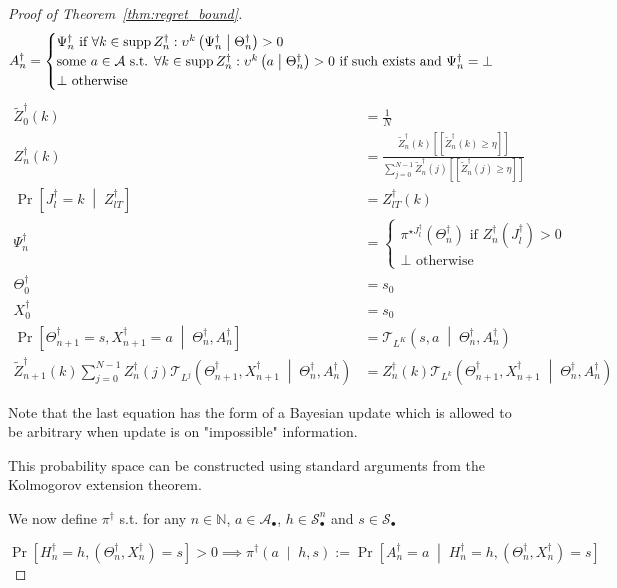 \documentclass[anon,12pt]{colt2018} %
\DeclareMathOperator{\Supp}{supp}
\newcommand{\AP}[1]{\left(#1\right)}
\newcommand{\APM}[2]{\left(#1\;\middle\vert\;#2\right)}
\newcommand{\ABM}[2]{\left[#1\;\middle\vert\;#2\right]}
\newcommand{\CP}[3]{\underset{#1}{\operatorname{Pr}}\ABM{#2}{#3}}
\newcommand{\Nats}{\mathbb{N}}
\newcommand{\A}{\mathcal{A}}
\newcommand{\St}{\mathcal{S}}
\newcommand{\T}{\mathcal{T}}
\newcommand{\Ad}{\upsilon}
\newcommand{\X}{\bullet}
\begin{document}
\begin{proof}[Proof of Theorem~\ref{thm:regret_bound}]
\[A^\dagger_n = \begin{cases} \Psi^\dagger_n \text{ if } \forall k \in \Supp{Z^\dagger_n}: \Ad^k\APM{\Psi^\dagger_n}{\Theta^\dagger_n} > 0 \\ \text{some } a\in\A \text{ s.t. } \forall k \in \Supp{Z^\dagger_n}: \Ad^k\APM{a}{\Theta^\dagger_n} > 0 \text{ if such exists and } \Psi^\dagger_n=\bot\\\bot \text{ otherwise} \end{cases}\\\]
%
\begin{align*}
\tilde{Z}^\dagger_0(k)&=\frac{1}{N} \\ 
Z^\dagger_{n}(k) &= \frac{\tilde{Z}^\dagger_{n}(k)[[\tilde{Z}^\dagger_{n}(k) \geq \eta]] }{\sum_{j = 0}^{N-1}\tilde{Z}^\dagger_{n}(j)[[\tilde{Z}^\dagger_{n}(j) \geq \eta]]}\\
\CP{}{J^\dagger_{l} = k}{Z^\dagger_{lT}} &= Z^\dagger_{lT}\left(k\right)\\
\Psi^\dagger_{n} &= \begin{cases} \pi^{\star J^\dagger_l}\AP{\Theta^\dagger_n} \text{ if } Z^\dagger_n\AP{J^\dagger_l} > 0 \\ \bot \text{ otherwise} \end{cases}\\
\Theta^\dagger_0 &= s_0\\
X^\dagger_0 &= s_0\\
\CP{}{\Theta^\dagger_{n+1} = s,X^\dagger_{n+1}=a}{\Theta^\dagger_{n},A^\dagger_n} &= \T_{L^K}\APM{s,a}{\Theta^\dagger_n,A^\dagger_n}\\
\tilde{Z}^\dagger_{n+1}(k)\sum_{j = 0}^{N-1} Z^\dagger_n(j) \T_{L^j}\APM{\Theta^\dagger_{n+1},X^\dagger_{n+1}}{\Theta^\dagger_n,A^\dagger_n}&=Z^\dagger_{n}(k) \T_{L^k}\APM{\Theta^\dagger_{n+1},X^\dagger_{n+1}}{\Theta^\dagger_n,A^\dagger_n}
\end{align*}

Note that the last equation has the form of a Bayesian update which is allowed to be arbitrary when update is on "impossible" information.

This probability space can be constructed using standard arguments from the Kolmogorov extension theorem.

We now define $\pi^\dagger$ s.t. for any $n \in \Nats$, $a \in \A_\X$, $h \in \St_\X^n$ and $s\in\St_\X$

$$\Pr\left[H^\dagger_n=h,\AP{\Theta^\dagger_n,X^\dagger_n}=s\right] > 0 \implies \pi^\dagger\APM{a}{h,s}:=\CP{}{A^\dagger_n=a}{H^\dagger_n=h,\AP{\Theta^\dagger_n,X^\dagger_n}=s}$$


\end{proof}
\end{document}
